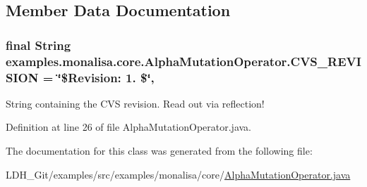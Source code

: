 \subsection{Member Data Documentation}
\hypertarget{classexamples_1_1monalisa_1_1core_1_1_alpha_mutation_operator_a4d6391bbaf0400e4f4cc1075744b2711}{
\subsubsection[{C\-V\-S\-\_\-\-R\-E\-V\-I\-S\-I\-O\-N}]{\setlength{\rightskip}{0pt plus 5cm}final String examples.\-monalisa.\-core.\-Alpha\-Mutation\-Operator.\-C\-V\-S\-\_\-\-R\-E\-V\-I\-S\-I\-O\-N = \char`\"{}\$Revision\-: 1. \$\char`\"{}\hspace{0.3cm}{\ttfamily [static]}, {\ttfamily [private]}}}\label{classexamples_1_1monalisa_1_1core_1_1_alpha_mutation_operator_a4d6391bbaf0400e4f4cc1075744b2711}
String containing the C\-V\-S revision. Read out via reflection! 

Definition at line 26 of file Alpha\-Mutation\-Operator.\-java.



The documentation for this class was generated from the following file\-:\begin{DoxyCompactItemize}
\item 
L\-D\-H\-\_\-\-Git/examples/src/examples/monalisa/core/\hyperlink{_alpha_mutation_operator_8java}{Alpha\-Mutation\-Operator.\-java}\end{DoxyCompactItemize}
